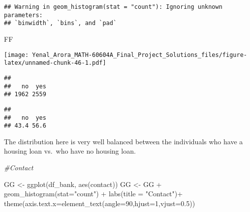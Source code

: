 \documentclass[
]{article}
\newenvironment{Shaded}{\begin{snugshade}}{\end{snugshade}}
\newcommand{\AttributeTok}[1]{\textcolor[rgb]{0.77,0.63,0.00}{#1}}
\newcommand{\CommentTok}[1]{\textcolor[rgb]{0.56,0.35,0.01}{\textit{#1}}}
\newcommand{\DecValTok}[1]{\textcolor[rgb]{0.00,0.00,0.81}{#1}}
\newcommand{\FloatTok}[1]{\textcolor[rgb]{0.00,0.00,0.81}{#1}}
\newcommand{\FunctionTok}[1]{\textcolor[rgb]{0.00,0.00,0.00}{#1}}
\newcommand{\NormalTok}[1]{#1}
\newcommand{\OtherTok}[1]{\textcolor[rgb]{0.56,0.35,0.01}{#1}}
\newcommand{\SpecialCharTok}[1]{\textcolor[rgb]{0.00,0.00,0.00}{#1}}
\newcommand{\StringTok}[1]{\textcolor[rgb]{0.31,0.60,0.02}{#1}}
\begin{document}
\begin{verbatim}
## Warning in geom_histogram(stat = "count"): Ignoring unknown parameters:
## `binwidth`, `bins`, and `pad`
\end{verbatim}

\begin{Shaded}
\begin{Highlighting}[]
\NormalTok{FF}
\end{Highlighting}
\end{Shaded}

\texttt{[image: Yenal\_Arora\_MATH-60604A\_Final\_Project\_Solutions\_files/figure-latex/unnamed-chunk-46-1.pdf]}

\begin{Shaded}
\end{Shaded}

\begin{verbatim}
## 
##   no  yes 
## 1962 2559
\end{verbatim}

\begin{Shaded}
\end{Shaded}

\begin{verbatim}
## 
##   no  yes 
## 43.4 56.6
\end{verbatim}

The distribution here is very well balanced between the individuals who
have a housing loan vs.~who have no housing loan.

\begin{Shaded}
\begin{Highlighting}[]
\CommentTok{\#Contact}

\NormalTok{GG }\OtherTok{\textless{}{-}} \FunctionTok{ggplot}\NormalTok{(df\_bank, }\FunctionTok{aes}\NormalTok{(contact))}
\NormalTok{GG }\OtherTok{\textless{}{-}}\NormalTok{ GG }\SpecialCharTok{+} \FunctionTok{geom\_histogram}\NormalTok{(}\AttributeTok{stat=}\StringTok{"count"}\NormalTok{) }\SpecialCharTok{+} \FunctionTok{labs}\NormalTok{(}\AttributeTok{title =} \StringTok{"Contact"}\NormalTok{)}\SpecialCharTok{+}
  \FunctionTok{theme}\NormalTok{(}\AttributeTok{axis.text.x=}\FunctionTok{element\_text}\NormalTok{(}\AttributeTok{angle=}\DecValTok{90}\NormalTok{,}\AttributeTok{hjust=}\DecValTok{1}\NormalTok{,}\AttributeTok{vjust=}\FloatTok{0.5}\NormalTok{))}
\end{Highlighting}
\end{Shaded}
\end{document}
